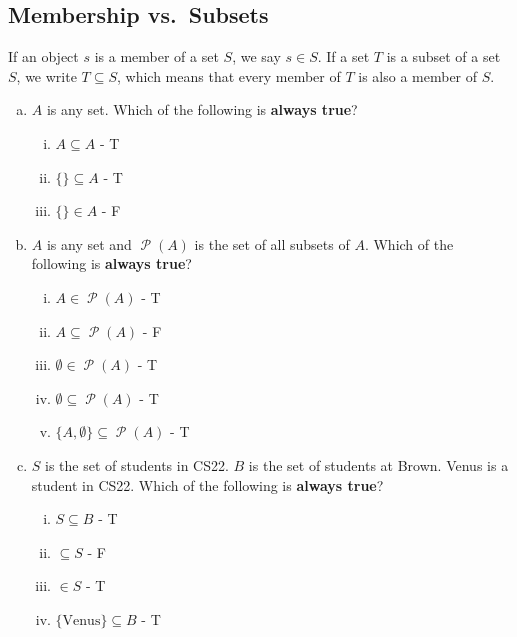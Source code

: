 \documentclass[12pt,letterpaper]{article}
\newcommand\Pow{\ensuremath{\operatorname{\mathcal{P}}}}
\begin{document}
    \subsection{Membership vs.\ Subsets}
    
    If an object $s$ is a member of a set $S$, we say $s \in S$. If a set $T$ is a subset of a set $S$, we write $T \subseteq S$, which means that every member of $T$ is also a member of $S$.
    
    \begin{mdframed}
        \begin{enumerate}[a.]
        \item $A$ is any set. Which of the following is \textbf{always true}?
          \begin{enumerate}[i.]
            \item $A \subseteq A$ - T
            \item $\{\} \subseteq A$ - T
            \item $\{\} \in A$ - F
         \end{enumerate}
      \item $A$ is any set and $\Pow{(A)}$ is the set of all subsets of $A$. Which of the following is \textbf{always true}?
        \begin{enumerate}[i.]
           \item $A \in \Pow{(A)}$ - T
           \item $A \subseteq \Pow{(A)}$ - F  
           \item $\emptyset \in \Pow{(A)}$ - T
           \item $\emptyset \subseteq \Pow{(A)}$ - T  
           \item $\{A, \emptyset\} \subseteq \Pow{(A)}$ - T
          \end{enumerate}
        \item $S$ is the set of students in CS22. $B$ is the set of students at Brown. Venus is a student in CS22. Which of the following is \textbf{always true}?
        \begin{enumerate}[i.]
          \item $S \subseteq B$ - T
          \item {} $\subseteq S$ - F  
          \item {} $\in S$ - T
          \item $\{\text{Venus}\} \subseteq B$ - T
        \end{enumerate}
      \end{enumerate}
          
    \end{mdframed}
\end{document}
